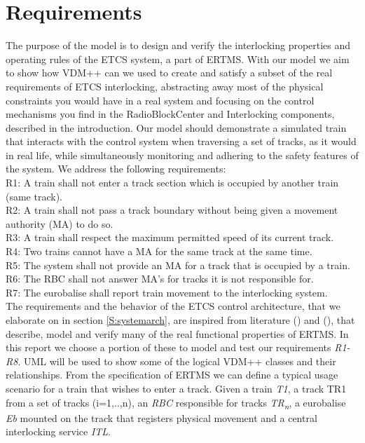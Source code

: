 \documentclass[preprint,12pt]{elsarticle}
\begin{document}
\section{Requirements}
\label{S:requirements}
The purpose of the model is to design and verify the interlocking properties and operating rules of the ETCS system, a part of ERTMS. With our model we aim to show how VDM++ can we used to create and satisfy a subset of the real requirements of ETCS interlocking, abstracting away most of the physical constraints you would have in a real system and focusing on the control mechanisms you find in the RadioBlockCenter and Interlocking components, described in the introduction. Our model should demonstrate a simulated train that interacts with the control system when traversing a set of tracks, as it would in real life, while simultaneously monitoring and adhering to the safety features of the system. We address the following requirements: \\

R1: A train shall not enter a track section which is occupied by another train (same track).\\
R2: A train shall not pass a track boundary without being given a movement authority (MA) to do so.\\
R3: A train shall respect the maximum permitted speed of its current track.\\
R4: Two trains cannot have a MA for the same track at the same time.\\
R5: The system shall not provide an MA for a track that is occupied by a train.\\
R6: The RBC shall not answer MA's for tracks it is not responsible for.\\
R7: The eurobalise shall report train movement to the interlocking system.\\

The requirements and the behavior of the ETCS control architecture, that we elaborate on in section \ref{S:systemarch}, are inspired from literature (\citet{Berger2018}) and (\citet{Ghazel2014}), that describe, model and verify many of the real functional properties of ERTMS. In this report we choose a portion of these to model and test our requirements \textit{R1-R8}. UML will be used to show some of the logical VDM++ classes and their relationships. From the specification of ERTMS we can define a typical usage scenario for a train that wishes to enter a track. Given a train \textit{T1}, a track TR1 from a set of tracks (i=1,..,n), an \textit{RBC} responsible for tracks \textit{TR\textsubscript{n}}, a eurobalise \textit{Eb} mounted on the track that registers physical movement and a central interlocking service \textit{ITL}.
\end{document}
